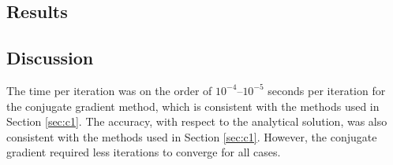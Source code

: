\documentclass[a4paper,10pt]{article}
\begin{document}
	
	
	\subsection{Results}
	
	
	\subsection{Discussion}
	
	The time per iteration was on the order of $10^{-4}$--$10^{-5}$ seconds per iteration for the conjugate gradient method, which is consistent with the methods used in Section \ref{sec:c1}.
	The accuracy, with respect to the analytical solution, was also consistent with the methods used in Section \ref{sec:c1}.
	However, the conjugate gradient required less iterations to converge for all cases.
	
\end{document}
